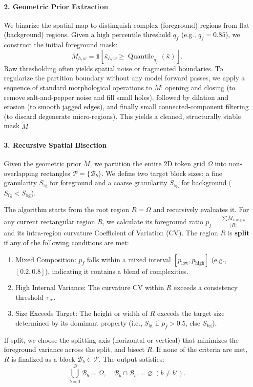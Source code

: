 \paragraph{2. Geometric Prior Extraction}
We binarize the spatial map to distinguish complex (foreground) regions from flat (background) regions. Given a high percentile threshold $q_f$ (e.g., $q_f = 0.85$), we construct the initial foreground mask:
\begin{equation}
    M_{h,w} = \mathbb{1}\!\left[ \bar{\kappa}_{h,w} \ge \operatorname{Quantile}_{q_f}(\bar{\kappa}) \right].
\end{equation}
Raw thresholding often yields spatial noise or fragmented boundaries. To regularize the partition boundary without any model forward passes, we apply a sequence of standard morphological operations to $M$: opening and closing (to remove salt-and-pepper noise and fill small holes), followed by dilation and erosion (to smooth jagged edges), and finally small connected-component filtering (to discard degenerate micro-regions). This yields a cleaned, structurally stable mask $\tilde{M}$.

\paragraph{3. Recursive Spatial Bisection}
Given the geometric prior $\tilde{M}$, we partition the entire 2D token grid $\Omega$ into non-overlapping rectangles $\mathcal{P}=\{\mathcal{B}_b\}$. We define two target block sizes: a fine granularity $S_{\text{fg}}$ for foreground and a coarse granularity $S_{\text{bg}}$ for background ($S_{\text{fg}} < S_{\text{bg}}$). 

The algorithm starts from the root region $R = \Omega$ and recursively evaluates it. For any current rectangular region $R$, we calculate its foreground ratio $p_f = \frac{\sum \tilde{M}_{h,w \in R}}{|R|}$ and its intra-region curvature Coefficient of Variation (CV). The region $R$ is \textbf{split} if any of the following conditions are met:
\begin{enumerate}
    \item Mixed Composition: $p_f$ falls within a mixed interval $[p_{\text{low}}, p_{\text{high}}]$ (e.g., $[0.2, 0.8]$), indicating it contains a blend of complexities.
    \item High Internal Variance: The curvature CV within $R$ exceeds a consistency threshold $\tau_{\text{cv}}$.
    \item Size Exceeds Target: The height or width of $R$ exceeds the target size determined by its dominant property (i.e., $S_{\text{fg}}$ if $p_f > 0.5$, else $S_{\text{bg}}$).
\end{enumerate}
If split, we choose the splitting axis (horizontal or vertical) that minimizes the foreground variance across the split, and bisect $R$. If none of the criteria are met, $R$ is finalized as a block $\mathcal{B}_b \in \mathcal{P}$. The output satisfies:
\begin{equation}
    \bigcup_{b=1}^{\mathcal{B}}\mathcal{\mathcal{B}}_b=\Omega, \quad \mathcal{B}_b \cap \mathcal{\mathcal{B}}_{b'}=\varnothing\;(b\ne b').
\end{equation}

